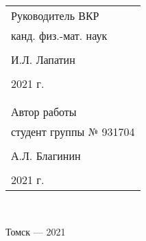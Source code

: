 \begin{flushright}\linespread{0.9}
	\normalsize{ 
		\begin{tabular}{@{}l@{}}
		Руководитель ВКР\\
		 канд. физ.-мат. наук\\\\ \underline{\hspace{3.5cm}} И.Л. Лапатин\\\\
		 \textquote{\underline{\hspace{1cm}}}\underline{\hspace{4cm}}2021 г.\\
		  \break
		  \\\\
		Автор работы\\
		  студент группы № 931704\\\\ \underline{\hspace{3.5cm}} А.Л. Благинин\\\\
		 \textquote{\underline{\hspace{1cm}}}\underline{\hspace{4cm}}2021 г.
		\end{tabular}	
	}\\

\end{flushright}
	\hfill \break
	\hfill \break
	\hfill \break
	\begin{center} Томск --- 2021 \end{center}
	\thispagestyle{empty} %
	\clearpage
